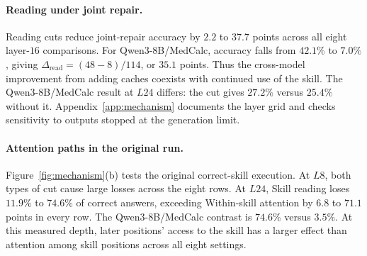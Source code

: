 \paragraph{Reading under joint repair.}
Reading cuts reduce joint-repair accuracy by $2.2$ to $37.7$ points
across all eight layer-$16$ comparisons. For Qwen3-8B/MedCalc, accuracy falls
from $42.1\%$ to $7.0\%$, giving $\Delta_{\mathrm{read}}=(48-8)/114$,
or $35.1$ points. Thus the cross-model improvement from adding caches
coexists with continued use of the skill. The Qwen3-8B/MedCalc result at
$L24$ differs: the cut gives $27.2\%$ versus $25.4\%$ without it.
Appendix~\ref{app:mechanism} documents the layer grid and checks sensitivity
to outputs stopped at the generation limit.

\paragraph{Attention paths in the original run.}
Figure~\ref{fig:mechanism}(b) tests the original correct-skill execution.
At $L8$, both types of cut cause large losses across the eight rows.
At $L24$, Skill reading loses $11.9\%$ to $74.6\%$ of correct answers,
exceeding Within-skill attention by $6.8$ to $71.1$ points in every row.
The Qwen3-8B/MedCalc contrast is $74.6\%$ versus $3.5\%$.
At this measured depth, later positions' access to the skill has a
larger effect than attention among skill positions across all eight settings.
